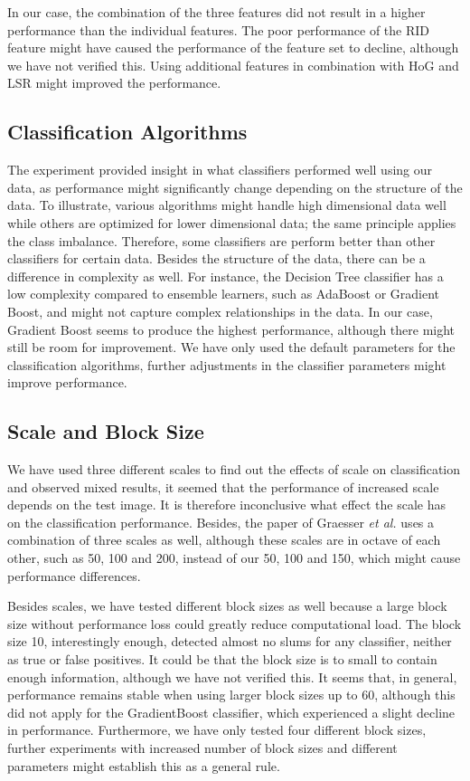 In our case, the combination of the three features did not result in a higher performance than the individual features. The poor performance of the RID feature might have caused the performance of the feature set to decline, although we have not verified this. Using additional features in combination with HoG and LSR might improved the performance.


\subsection{Classification Algorithms}
The experiment provided insight in what classifiers performed well using our data, as performance might significantly change depending on the structure of the data. To illustrate, various algorithms might handle high dimensional data well while others are optimized for lower dimensional data; the same principle applies the class imbalance. Therefore, some classifiers are perform better than other classifiers for certain data. Besides the structure of the data, there can be a difference in complexity as well. For instance, the Decision Tree classifier has a low complexity compared to ensemble learners,  such as AdaBoost or Gradient Boost, and might not capture complex relationships in the data. In our case, Gradient Boost seems to produce the highest performance, although there might still be room for improvement. We have only used the default parameters for the classification algorithms, further adjustments in the classifier parameters might improve performance.


\subsection{Scale and Block Size}
We have used three different scales to find out the effects of scale on classification and observed mixed results, it seemed that the performance of increased scale depends on the test image. It is therefore inconclusive what effect the scale has on the classification performance. Besides, the paper of Graesser \textit{et al.} uses a combination of three scales as well, although these scales are in octave of each other, such as 50, 100 and 200, instead of our 50, 100 and 150, which might cause performance differences.
\newline

\noindent
Besides scales, we have tested different block sizes as well because a large block size without performance loss could greatly reduce computational load. The block size 10, interestingly enough, detected almost no slums for any classifier, neither as true or false positives. It could be that the block size is to small to contain enough information, although we have not verified this. It seems that, in general, performance remains stable when using larger block sizes up to 60, although this did not apply for the GradientBoost classifier, which experienced a slight decline in performance. Furthermore, we have only tested four different block sizes, further experiments with increased number of block sizes and different parameters might establish this as a general rule.

